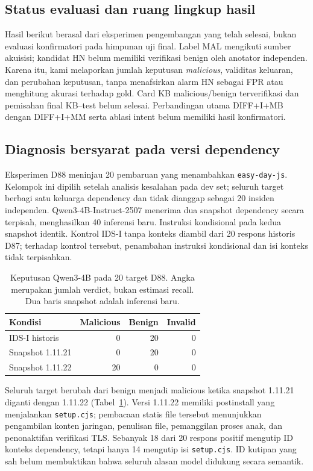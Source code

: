 \subsection{Status evaluasi dan ruang lingkup hasil}
\label{sec:exploratory-status}

Hasil berikut berasal dari eksperimen pengembangan yang telah selesai,
bukan evaluasi konfirmatori pada himpunan uji final. Label MAL mengikuti
sumber akuisisi; kandidat HN belum memiliki verifikasi benign oleh anotator
independen. Karena itu, kami melaporkan jumlah keputusan \emph{malicious},
validitas keluaran, dan perubahan keputusan, tanpa menafsirkan alarm HN
sebagai FPR atau menghitung akurasi terhadap gold. Card KB malicious/benign
terverifikasi dan pemisahan final KB--test belum selesai. Perbandingan utama
DIFF+I+MB dengan DIFF+I+MM serta ablasi intent belum memiliki hasil
konfirmatori.

\subsection{Diagnosis bersyarat pada versi dependency}
\label{sec:dependency-diagnosis}

Eksperimen D88 meninjau 20 pembaruan yang menambahkan
\texttt{easy-day-js}. Kelompok ini dipilih setelah analisis kesalahan pada
dev set; seluruh target berbagi satu keluarga dependency dan tidak dianggap
sebagai 20 insiden independen. Qwen3-4B-Instruct-2507 menerima dua snapshot
dependency secara terpisah, menghasilkan 40 inferensi baru. Instruksi
kondisional pada kedua snapshot identik. Kontrol IDS-I tanpa konteks
diambil dari 20 respons historis D87; terhadap kontrol tersebut, penambahan
instruksi kondisional dan isi konteks tidak terpisahkan.

\begin{table}[t]
\caption{Keputusan Qwen3-4B pada 20 target D88. Angka merupakan jumlah
verdict, bukan estimasi recall. Dua baris snapshot adalah inferensi baru.}
\label{tab:dependency-versions}
\centering
\begin{tabular}{lrrr}
\toprule
Kondisi & Malicious & Benign & Invalid \\
\midrule
IDS-I historis & 0 & 20 & 0 \\
Snapshot 1.11.21 & 0 & 20 & 0 \\
Snapshot 1.11.22 & 20 & 0 & 0 \\
\bottomrule
\end{tabular}
\end{table}

Seluruh target berubah dari benign menjadi malicious ketika snapshot
1.11.21 diganti dengan 1.11.22 (Tabel~\ref{tab:dependency-versions}).
Versi 1.11.22 memiliki postinstall yang menjalankan \texttt{setup.cjs};
pembacaan statis file tersebut menunjukkan pengambilan konten jaringan,
penulisan file, pemanggilan proses anak, dan penonaktifan verifikasi TLS.
Sebanyak 18 dari 20 respons positif mengutip ID konteks dependency,
tetapi hanya 14 mengutip isi \texttt{setup.cjs}. ID kutipan yang sah belum
membuktikan bahwa seluruh alasan model didukung secara semantik.

